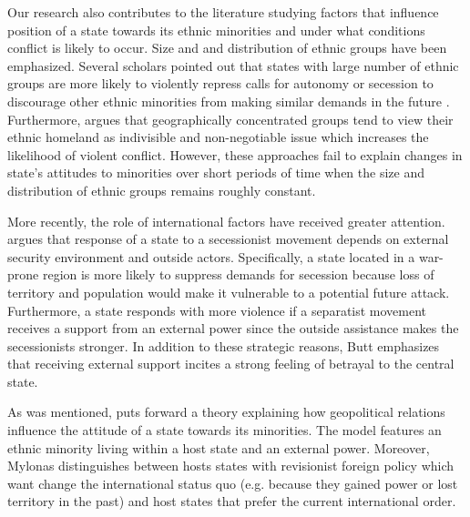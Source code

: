Our research also contributes to the literature studying factors that influence position of a state towards its ethnic minorities and under what conditions conflict is likely to occur. Size and and distribution of ethnic groups have been emphasized. Several scholars pointed out that
states with large number of ethnic groups are more likely to violently repress calls for autonomy or secession to discourage other ethnic minorities from making similar demands in the future \citep{evera_hypotheses_1994, toft_geography_2005,walter_reputation_2009}. 
Furthermore,  \citet{toft_geography_2005} argues that geographically concentrated groups tend to view their ethnic homeland as indivisible and non-negotiable issue which increases the likelihood of violent conflict. However, these approaches fail to explain changes in state's attitudes to minorities over short periods of time when the size and distribution of ethnic groups remains roughly constant. 

More recently, the role of international factors have received greater attention.  \citet{butt_secession_2017}  argues that response of a state to a secessionist movement depends on external security environment and outside actors. Specifically, a state located in a war-prone region is more likely to suppress demands for secession because loss of territory and population would make it vulnerable  to a potential future attack. Furthermore, a state responds with more violence if a separatist movement receives a support from an external power since the outside assistance makes the secessionists stronger. In addition to these strategic reasons, Butt emphasizes that  receiving external support incites  a strong feeling of betrayal to the central state.   

As was mentioned, \citet{mylonas_politics_2013} puts forward a theory explaining how geopolitical relations influence the attitude of a state towards its minorities. The model features an ethnic minority living within a host state and  an external power. Moreover, Mylonas distinguishes between hosts states with revisionist foreign policy which want change the international status quo (e.g. because they gained power or lost territory in the past) and host states that prefer the current international order. 

